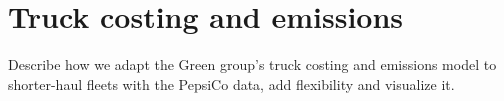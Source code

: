 \section{Truck costing and emissions}
Describe how we adapt the Green group's truck costing and emissions model to shorter-haul fleets with the PepsiCo data, add flexibility and visualize it.